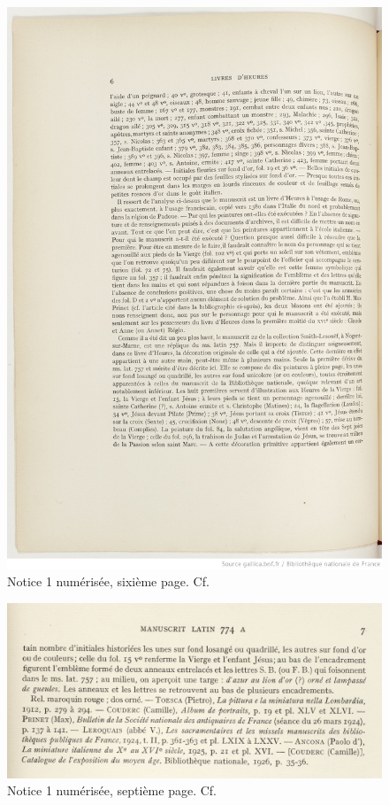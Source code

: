 \documentclass[a4paper,12pt,twoside]{book}
\begin{document}
    \begin{figure}[!h]
    \centering
    \includegraphics[width=15cm]{img/Notices_Leroquais/Notice1/Papier/notice_papier_1_6.jpeg}
    \caption{Notice 1 numérisée, sixième page. Cf. \cite[p. 6]{Leroquais_notices}}
    \end{figure}
    \clearpage
    
    \begin{figure}[!h]
    \centering
    \includegraphics[width=15cm]{img/Notices_Leroquais/Notice1/Papier/notice_papier_1_7.jpg}
    \caption{Notice 1 numérisée, septième page. Cf. \cite[p. 7]{Leroquais_notices}}
    \end{figure}
    \clearpage
    
\end{document}
